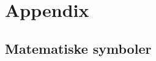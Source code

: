\chapter{Appendix}
\renewcommand{\labelprefix}{app:notation}
\llabel{}

\newenvironment{mydescription}
{\begin{list}{}{\setlength\labelwidth{0pt}%
               \setlength\itemindent{-\leftmargin}%
               \addtolength{\itemindent}{5pt}
               \setlength\itemsep{8pt plus 1pt}%
               \let\makelabel\mydescriptionlabel}}
{\end{list}}
\newcommand*\mydescriptionlabel[1]{#1}

\section{Matematiske symboler}


